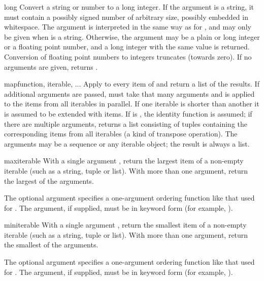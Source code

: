 \begin{funcdesc}{long}{}
  Convert a string or number to a long integer.  If the argument is a
  string, it must contain a possibly signed number of
  arbitrary size, possibly embedded in whitespace. The
   argument is interpreted in the same way as for
  , and may only be given when  is a string.
  Otherwise, the argument may be a plain or
  long integer or a floating point number, and a long integer with
  the same value is returned.    Conversion of floating
  point numbers to integers truncates (towards zero).  If no arguments
  are given, returns .
\end{funcdesc}

\begin{funcdesc}{map}{function, iterable, ...}
  Apply  to every item of  and return a list
  of the results.  If additional  arguments are passed,
   must take that many arguments and is applied to the
  items from all iterables in parallel.  If one iterable is shorter than another it
  is assumed to be extended with  items.  If 
  is , the identity function is assumed; if there are
  multiple arguments,  returns a list consisting
  of tuples containing the corresponding items from all iterables (a kind
  of transpose operation).  The  arguments may be a sequence 
  or any iterable object; the result is always a list.
\end{funcdesc}

\begin{funcdesc}{max}{iterable}
  With a single argument , return the largest item of a
  non-empty iterable (such as a string, tuple or list).  With more
  than one argument, return the largest of the arguments.

  The optional  argument specifies a one-argument ordering
  function like that used for .  The 
  argument, if supplied, must be in keyword form (for example,
  ).
\end{funcdesc}

\begin{funcdesc}{min}{iterable}
  With a single argument , return the smallest item of a
  non-empty iterable (such as a string, tuple or list).  With more
  than one argument, return the smallest of the arguments.

  The optional  argument specifies a one-argument ordering
  function like that used for .  The 
  argument, if supplied, must be in keyword form (for example,
  ).
\end{funcdesc}

